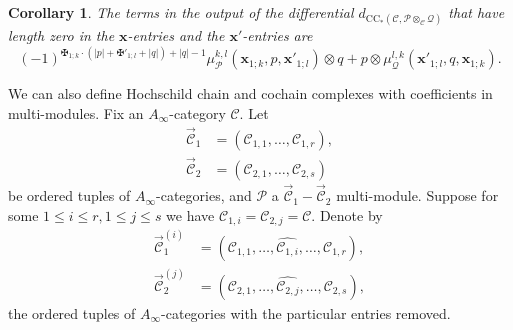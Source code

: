 \documentclass[11pt]{amsproc}
\def\cP{\mathcal{P}}
\def\cQ{\mathcal{Q}}
\def\cc{\mathcal{C}}
\def\r#1{\mathrm{#1}}
\def\ainf{A_\infty}
\newtheorem{cor}[lem]{Corollary}
\theoremstyle{remark}
\numberwithin{equation}{section}
\begin{document}
\begin{cor}\label{cor: length zero tensors}
The terms in the output of the differential $d_{\r{CC}_{*}(\cc, \cP \otimes_{\cc} \cQ)}$ that have length zero in the $\mathbf{x}$-entries and the $\mathbf{x}'$-entries are
\begin{equation}\label{length zero tensors}
 (-1)^{\maltese_{1;k} \cdot (|p| + \maltese'_{1;l} + |q|) + |q| - 1} \mu_{\cP}^{k, l}(\mathbf{x}_{1;k}, p, \mathbf{x}'_{1;l}) \otimes q 
+  p \otimes \mu_{\cQ}^{l, k}(\mathbf{x}'_{1;l}, q, \mathbf{x}_{1;k}).
\end{equation}
\end{cor}

We can also define Hochschild chain and cochain complexes with coefficients in multi-modules.
Fix an $\ainf$-category $\cc$.
Let 
\begin{align}
\overrightarrow{\cc}_{1} &= (\cc_{1, 1}, \ldots, \cc_{1, r}), \\
\overrightarrow{\cc}_{2} &= (\cc_{2, 1}, \ldots, \cc_{2, s})
\end{align}
be ordered tuples of $\ainf$-categories, 
and $\cP$ a $\overrightarrow{\cc}_{1} - \overrightarrow{\cc}_{2}$ multi-module.
Suppose for some $1 \le i \le r, 1 \le j \le s$ we have $\cc_{1, i} = \cc_{2, j} = \cc$.
Denote by
\begin{align}
\overrightarrow{\cc}_{1}^{(i)} &= (\cc_{1, 1}, \ldots, \widehat{\cc_{1, i}}, \ldots, \cc_{1, r}), \\
\overrightarrow{\cc}_{2}^{(j)} &= (\cc_{2, 1}, \ldots, \widehat{\cc_{2, j}}, \ldots, \cc_{2, s}),
\end{align}
the ordered tuples of $\ainf$-categories with the particular entries removed.
\end{document}
